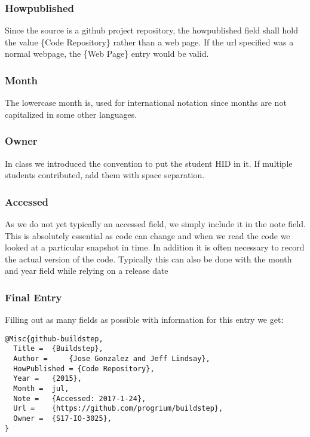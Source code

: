 \subsubsection{Howpublished}\label{howpublished}

Since the source is a github project repository, the howpublished field
shall hold the value \{Code Repository\} rather than a web page. If the
url specified was a normal webpage, the \{Web Page\} entry would be
valid.

\subsubsection{Month}\label{month}

The lowercase month is, used for international notation since months are
not capitalized in some other languages.

\subsubsection{Owner}\label{owner}

In class we introduced the convention to put the student HID in it. If
multiple students contributed, add them with space separation.

\subsubsection{Accessed}\label{accessed}

As we do not yet typically an accessed field, we simply include it in
the note field. This is absolutely essential as code can change and when
we read the code we looked at a particular snapshot in time. In addition
it is often necessary to record the actual version of the code.
Typically this can also be done with the month and year field while
relying on a release date

\subsubsection{Final Entry}\label{final-entry}

Filling out as many fields as possible with information for this entry
we get:

\begin{verbatim}
@Misc{github-buildstep,
  Title =  {Buildstep},
  Author =     {Jose Gonzalez and Jeff Lindsay},
  HowPublished = {Code Repository},
  Year =   {2015},
  Month =  jul,
  Note =   {Accessed: 2017-1-24},
  Url =    {https://github.com/progrium/buildstep},
  Owner =  {S17-IO-3025},
}
\end{verbatim}

